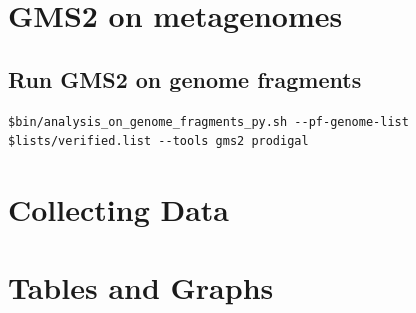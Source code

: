 \documentclass[11pt]{article}
\begin{document}
\section{GMS2 on metagenomes}
\label{sec:orgc561bb0}
\subsection{Run GMS2 on genome fragments}
\label{sec:org3a5020c}
\begin{verbatim}
$bin/analysis_on_genome_fragments_py.sh --pf-genome-list $lists/verified.list --tools gms2 prodigal
\end{verbatim}
\section{Collecting Data}
\label{sec:orga716c8d}

\section{Tables and Graphs}
\label{sec:org1765fc9}
\subsection{}
\label{sec:org73bd545}
\end{document}
